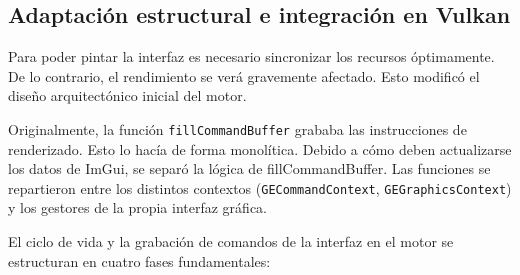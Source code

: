 \subsection{Adaptación estructural e integración en Vulkan}
Para poder pintar la interfaz es necesario sincronizar los recursos óptimamente. De lo contrario, el rendimiento se verá gravemente afectado.
Esto modificó el diseño arquitectónico inicial del motor.

Originalmente, la función \texttt{fillCommandBuffer} grababa las instrucciones de renderizado. Esto lo hacía de forma monolítica.
Debido a cómo deben actualizarse los datos de ImGui, se separó la lógica de fillCommandBuffer.
Las funciones se repartieron entre los distintos contextos (\texttt{GECommandContext}, \texttt{GEGraphicsContext}) y los gestores de la propia interfaz gráfica.

El ciclo de vida y la grabación de comandos de la interfaz en el motor se estructuran en cuatro fases fundamentales:

